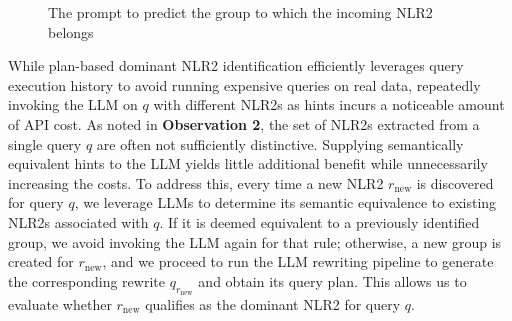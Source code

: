 \begin{figure}[t]
\sinv
  \centering
  \small
  \inv
  \captionsetup{font=small,name=Figure}
  \caption{The prompt to predict the group to which the incoming NLR2 belongs}
  \label{gen:fig:clustering}
  \inv
\end{figure}




While plan-based dominant NLR2 identification efficiently leverages query execution history to avoid running expensive queries on real data, repeatedly invoking the LLM on $q$ with different NLR2s as hints incurs a noticeable amount of API cost. As noted in \textbf{Observation 2}, the set of NLR2s extracted from a single query $q$ are often not sufficiently distinctive. Supplying semantically equivalent hints to the LLM yields little additional benefit while unnecessarily increasing the costs. To address this, every time a new NLR2 $r_{\text{new}}$ is discovered for query $q$, we leverage LLMs to determine its semantic equivalence to existing NLR2s associated with $q$. If it is deemed equivalent to a previously identified group, we avoid invoking the LLM again for that rule; otherwise, a new group is created for $r_{\text{new}}$, and we proceed to run the LLM rewriting pipeline to generate the corresponding rewrite $q_{r_{\text{new}}}$ and obtain its query plan. This allows us to evaluate whether $r_{\text{new}}$ qualifies as the dominant NLR2 for query $q$.


